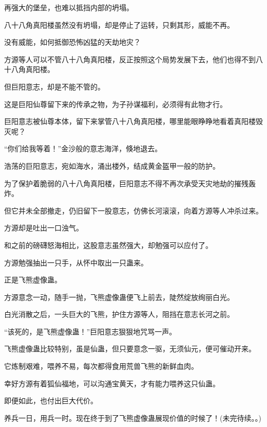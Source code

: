 \begin{this_body}
再强大的堡垒，也难以抵挡内部的坍塌。

八十八角真阳楼虽然没有坍塌，却是停止了运转，只剩其形，威能不再。

没有威能，如何抵御恐怖凶猛的天劫地灾？

方源等人可以不管八十八角真阳楼，反正按照这个局势发展下去，他们也得不到八十八角真阳楼。

但巨阳意志，却是不能不管的。

这是巨阳仙尊留下来的传承之物，为子孙谋福利，必须得有此物才行。

巨阳意志被仙尊本体，留下来掌管八十八角真阳楼，哪里能眼睁睁地看着真阳楼毁灭呢？

“你们给我等着！”金沙般的意志海洋，倏地退去。

浩荡的巨阳意志，宛如海水，涌出楼外，结成黄金盔甲一般的防护。

为了保护着脆弱的八十八角真阳楼，巨阳意志不得不再次承受天灾地劫的摧残轰炸。

但它并未全部撤走，仍旧留下一股意志，仿佛长河滚滚，向着方源等人冲杀过来。

方源却是吐出一口浊气。

和之前的磅礴怒海相比，这股意志虽然强大，却勉强可以应付了。

方源勉强抽出一只手，从怀中取出一只蛊来。

正是飞熊虚像蛊。

方源意念一动，随手一抛，飞熊虚像蛊便飞上前去，陡然绽放绚丽白光。

白光消散之后，一头巨大的飞熊，护住方源等人，阻挡在意志长河之前。

“该死的，是飞熊虚像蛊！”巨阳意志狠狠地咒骂一声。

飞熊虚像蛊比较特别，虽是仙蛊，但只要意念一驱，无须仙元，便可催动开来。

它炼制艰难，喂养不易，每次都得食用荒兽飞熊的新鲜血肉。

幸好方源有着狐仙福地，可以沟通宝黄天，才有能力喂养这只仙蛊。

即便如此，也付出巨大代价。

养兵一日，用兵一时。现在终于到了飞熊虚像蛊展现价值的时候了！(未完待续。。)

\end{this_body}

